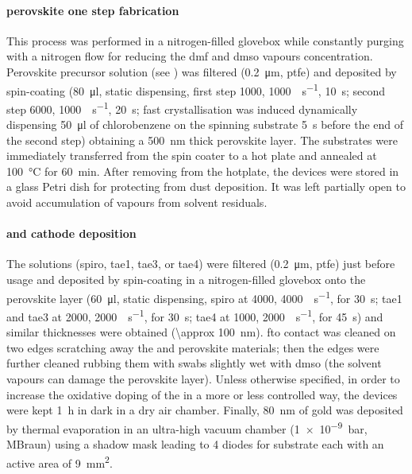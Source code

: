 		\paragraph{ perovskite one step fabrication}

		This process was performed in a nitrogen-filled glovebox
		while constantly purging with a nitrogen flow for reducing the \gls{dmf} and \gls{dmso} vapours concentration.
		Perovskite precursor solution (see ) was filtered (\SI{0.2}{\um}, \gls{ptfe})
		and deposited by spin-coating (\SI{80}{\ul}, static dispensing, first step \SI{1000}{\rpm}, \SI{1000}{\rpm\per\s}, \SI{10}{\s};
		second step \SI{6000}{\rpm}, \SI{1000}{\rpm\per\s}, \SI{20}{\s}; fast crystallisation was induced dynamically
		dispensing \SI{50}{\ul} of chlorobenzene on the spinning substrate \SI{5}{\s} before the end of the second
		step) obtaining a \SI{500}{\nm} thick perovskite layer.
		The substrates were immediately transferred from
		the spin coater to a hot plate and annealed at \SI{100}{\celsius} for \SI{60}{\minute}.
		After removing from the hotplate, the devices were stored in a glass Petri dish for protecting from dust deposition.
		It was left partially open to avoid accumulation of vapours from solvent residuals.

		\paragraph{ and cathode deposition}
		The  solutions (\gls{spiro}, \gls{tae1}, \gls{tae3}, or \gls{tae4}) were filtered (\SI{0.2}{\um}, \gls{ptfe}) just before usage and deposited by spin-coating in a nitrogen-filled glovebox
		onto the perovskite layer (\SI{60}{\ul}, static dispensing, \gls{spiro} at \SI{4000}{\rpm}, \SI{4000}{\rpm\per\s},
		for \SI{30}{\s}; \gls{tae1} and \gls{tae3} at \SI{2000}{\rpm}, \SI{2000}{\rpm\per\s}, for \SI{30}{\s}; \gls{tae4} at \SI{1000}{\rpm}, \SI{2000}{\rpm\per\s},
		for \SI{45}{\s}) and similar  thicknesses were obtained (\SI{\approx 100}{\nm}).
		\Gls{fto} contact was cleaned on two edges scratching away the  and perovskite materials; then the edges were further cleaned rubbing them with swabs slightly wet with \gls{dmso} (the solvent vapours can damage the perovskite layer).
		Unless otherwise specified, in order to increase the
		oxidative doping of the  in a more or less controlled way, the devices were kept \SI{1}{\hour} in dark in a dry air chamber.
		Finally, \SI{80}{\nm} of gold was deposited by thermal evaporation in an ultra-high vacuum chamber
		(\SI{1e-9}{\bar}, MBraun) using a shadow mask leading to 4 diodes for substrate each with an active area of
		\SI{9}{\mm\squared}.
		\label{methods_bottom_end}



